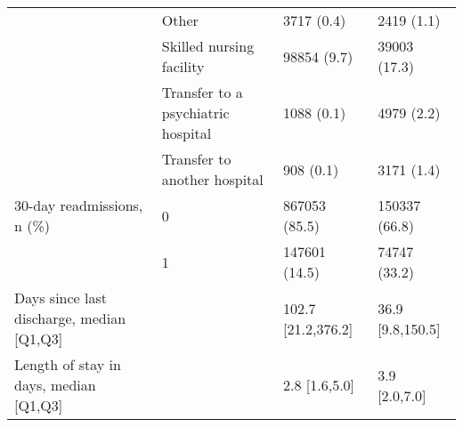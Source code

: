 \begin{tabular}{llll}
                                       & Other &               3717 (0.4) &        2419 (1.1) \\
                                       & Skilled nursing facility &              98854 (9.7) &      39003 (17.3) \\
                                       & Transfer to a psychiatric hospital &               1088 (0.1) &        4979 (2.2) \\
                                       & Transfer to another hospital &                908 (0.1) &        3171 (1.4) \\
30-day readmissions, n (\%) & 0 &            867053 (85.5) &     150337 (66.8) \\
                                       & 1 &            147601 (14.5) &      74747 (33.2) \\
Days since last discharge, median [Q1,Q3] &   &       102.7 [21.2,376.2] &  36.9 [9.8,150.5] \\
Length of stay in days, median [Q1,Q3] &   &            2.8 [1.6,5.0] &     3.9 [2.0,7.0] \\
\bottomrule
\end{tabular}
